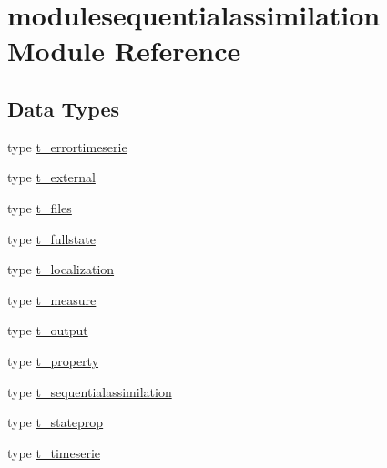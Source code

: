 \hypertarget{namespacemodulesequentialassimilation}{}\section{modulesequentialassimilation Module Reference}
\label{namespacemodulesequentialassimilation}
\subsection*{Data Types}
\begin{DoxyCompactItemize}
\item 
type \mbox{\hyperlink{structmodulesequentialassimilation_1_1t__errortimeserie}{t\+\_\+errortimeserie}}
\item 
type \mbox{\hyperlink{structmodulesequentialassimilation_1_1t__external}{t\+\_\+external}}
\item 
type \mbox{\hyperlink{structmodulesequentialassimilation_1_1t__files}{t\+\_\+files}}
\item 
type \mbox{\hyperlink{structmodulesequentialassimilation_1_1t__fullstate}{t\+\_\+fullstate}}
\item 
type \mbox{\hyperlink{structmodulesequentialassimilation_1_1t__localization}{t\+\_\+localization}}
\item 
type \mbox{\hyperlink{structmodulesequentialassimilation_1_1t__measure}{t\+\_\+measure}}
\item 
type \mbox{\hyperlink{structmodulesequentialassimilation_1_1t__output}{t\+\_\+output}}
\item 
type \mbox{\hyperlink{structmodulesequentialassimilation_1_1t__property}{t\+\_\+property}}
\item 
type \mbox{\hyperlink{structmodulesequentialassimilation_1_1t__sequentialassimilation}{t\+\_\+sequentialassimilation}}
\item 
type \mbox{\hyperlink{structmodulesequentialassimilation_1_1t__stateprop}{t\+\_\+stateprop}}
\item 
type \mbox{\hyperlink{structmodulesequentialassimilation_1_1t__timeserie}{t\+\_\+timeserie}}
\end{DoxyCompactItemize}
